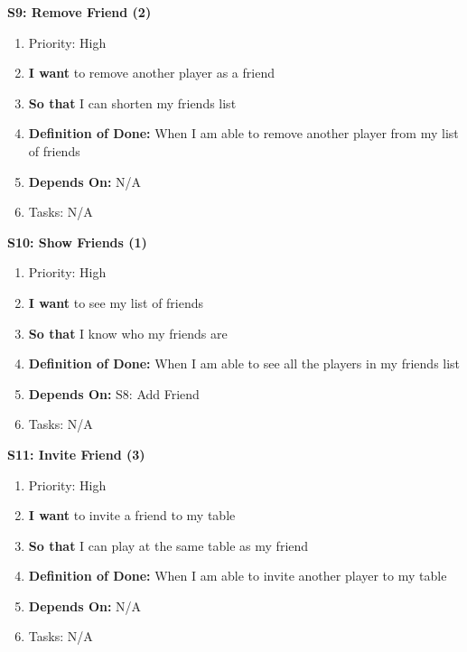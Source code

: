 \textbf{S9: Remove Friend (2)}
\begin{enumerate}
    \item Priority: High
    \item \textbf{I want} to remove another player as a friend
    \item \textbf{So that} I can shorten my friends list
    \item \textbf{Definition of Done:} When I am able to remove another player from my list of friends
    \item \textbf{Depends On:} N/A
    \item Tasks: N/A
\end{enumerate}


\textbf{S10: Show Friends (1)}
\begin{enumerate}
    \item Priority: High
    \item \textbf{I want} to see my list of friends
    \item \textbf{So that} I know who my friends are
    \item \textbf{Definition of Done:} When I am able to see all the players in my friends list
    \item \textbf{Depends On:} S8: Add Friend 
    \item Tasks: N/A
\end{enumerate}


\textbf{S11: Invite Friend (3)}
\begin{enumerate}
    \item Priority: High
    \item \textbf{I want} to invite a friend to my table
    \item \textbf{So that} I can play at the same table as my friend
    \item \textbf{Definition of Done:} When I am able to invite another player to my table
    \item \textbf{Depends On:} N/A
    \item Tasks: N/A
\end{enumerate}


